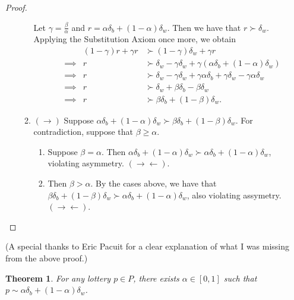 \documentclass[12pt]{article}
\newtheorem{thm}{Theorem}[section]
\theoremstyle{definition}
\theoremstyle{remark}
\def\contra{\rightarrow \leftarrow}
\begin{document}
\begin{proof}
\begin{enumerate}
\begin{enumerate}
      Let $\gamma = \frac{\beta}{\alpha}$ and $r = \alpha \delta_b + (1 - \alpha) \delta_w$. Then we have that $r \succ \delta_w$. Applying the Substitution Axiom once more, we obtain
      \begin{align*}
        &          & (1 - \gamma) r + \gamma r &\succ (1 - \gamma) \delta_w + \gamma r \\
        & \implies & r &\succ \delta_w - \gamma \delta_w + \gamma (\alpha \delta_b + (1 - \alpha) \delta_w) \\
        & \implies & r &\succ \delta_w - \gamma \delta_w + \gamma \alpha \delta_b + \gamma \delta_w - \gamma \alpha \delta_w \\
        & \implies & r &\succ \delta_w + \beta \delta_b - \beta \delta_w \\
        & \implies & r &\succ \beta \delta_b + (1 - \beta) \delta_w.
      \end{align*}
      \item $(\rightarrow)$ Suppose $\alpha \delta_b + (1 - \alpha)\delta_w \succ \beta \delta_b + (1 - \beta) \delta_w$. For contradiction, suppose that $\beta \geq \alpha$.
      \begin{enumerate}
        \item Suppose $\beta = \alpha$. Then $\alpha \delta_b + (1 - \alpha)\delta_w \succ \alpha \delta_b + (1 - \alpha)\delta_w$, violating asymmetry. $(\contra)$.
        \item Then $\beta > \alpha$. By the cases above, we have that $\beta \delta_b + (1 - \beta) \delta_w \succ \alpha \delta_b + (1 - \alpha)\delta_w$, also violating assymetry. $(\contra)$.
      \end{enumerate}
    \end{enumerate}
  \end{enumerate}
\end{proof}
(A special thanks to Eric Pacuit for a clear explanation of what I was missing from the above proof.)
%
%
\begin{thm} \label{lemma 2}
  For any lottery $p \in P$, there exists $\alpha \in [0,1]$ such that $p \sim \alpha \delta_b + (1 - \alpha) \delta_w$.
\end{thm}
\end{document}
